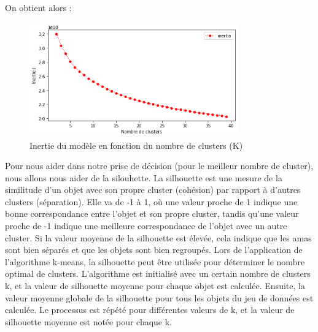 \documentclass{article}
\begin{document}
On obtient alors :
\begin{figure}[H]
	\centering
	\includegraphics[width=0.8\textwidth]{"./Images/inertia.png"}
	\caption{Inertie du modèle en fonction du nombre de clusters (K)}
	\label{fig:inertia}
\end{figure}


Pour nous aider dans notre prise de décision (pour le meilleur nombre de cluster), nous allons nous aider de la silouhette. La silhouette est une mesure de la similitude d’un objet avec son propre cluster (cohésion) par rapport à d’autres clusters (séparation). Elle va de -1 à 1, où une valeur proche de 1 indique une bonne correspondance entre l’objet et son propre cluster, tandis qu’une valeur proche de -1 indique une meilleure correspondance de l’objet avec un autre cluster. Si la valeur moyenne de la silhouette est élevée, cela indique que les amas sont bien séparés et que les objets sont bien regroupés.
Lors de l’application de l’algorithme k-means, la silhouette peut être utilisée pour déterminer le nombre optimal de clusters. L’algorithme est initialisé avec un certain nombre de clusters k, et la valeur de silhouette moyenne pour chaque objet est calculée. Ensuite, la valeur moyenne globale de la silhouette pour tous les objets du jeu de données est calculée. Le processus est répété pour différentes valeurs de k, et la valeur de silhouette moyenne est notée pour chaque k.
\end{document}
